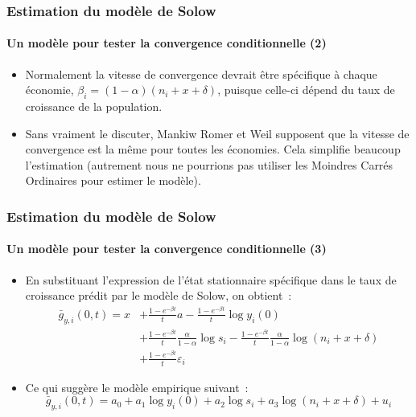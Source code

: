 \documentclass[10pt,notheorems]{beamer}
\theoremstyle{plain}
\theoremstyle{definition} %
\begin{document}
\begin{frame}
  \frametitle{Estimation du modèle de Solow}
  \framesubtitle{Un modèle pour tester la convergence conditionnelle (2)}

  \begin{itemize}

  \item[\textdbend] Normalement la vitesse de convergence devrait être spécifique à chaque économie, $\beta_i=(1-\alpha)(n_i+x+\delta)$, puisque celle-ci dépend du taux de croissance de la population.\newline

  \item Sans vraiment le discuter, Mankiw Romer et Weil supposent que la vitesse de convergence est la même pour toutes les économies. Cela simplifie beaucoup l'estimation (autrement nous ne pourrions pas utiliser les Moindres Carrés Ordinaires pour estimer le modèle).

  \end{itemize}

\end{frame}


\begin{frame}
  \frametitle{Estimation du modèle de Solow}
  \framesubtitle{Un modèle pour tester la convergence conditionnelle (3)}

  \begin{itemize}

  \item En substituant l'expression de l'état stationnaire spécifique dans le taux de croissance prédit par le modèle de Solow, on obtient~:
    \[
      \begin{split}
        \bar g_{y,i}(0,t) = x &+ \frac{1-e^{-\beta t}}{t} a - \frac{1-e^{-\beta t}}{t}\log y_i(0)\\
                                              &+ \frac{1-e^{-\beta t}}{t} \frac{\alpha}{1-\alpha}\log s_i - \frac{1-e^{-\beta t}}{t} \frac{\alpha}{1-\alpha}\log (n_i+x+\delta)\\
                                              &+ \frac{1-e^{-\beta t}}{t}\varepsilon_i
      \end{split}
    \]

  \item Ce qui suggère le modèle empirique suivant~:
    \[
      \bar g_{y,i}(0,t) = a_0 + a_1\log y_i(0) + a_2\log s_i + a_3 \log(n_i+x+\delta) + u_i
    \]

  \end{itemize}

\end{frame}
\end{document}
